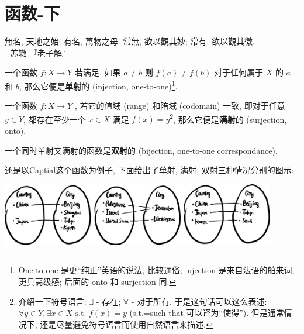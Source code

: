 \section{函数-下}\label{004}

\begin{flushright}{\kaishu 無名, 天地之始; 有名, 萬物之母. 常無, 欲以觀其妙; 常有, 欲以觀其徼. \\- 苏辙 『老子解』}\end{flushright}

\begin{tcolorbox}[size=fbox, breakable, enhanced jigsaw, title={单射, 满射, 双射 (injection, surjection,
bijection)}]

一个函数 $f:X\rightarrow Y$ 若满足, 如果 $a\neq b$ 则
$f(a)\neq f(b)$ 对于任何属于 $X$ 的 $a$ 和 $b$,
那么它便是\textbf{单射}的 (injection, one-to-one)\footnote{One-to-one
  是更``纯正''英语的说法, 比较通俗, injection 是来自法语的舶来词,
  更具高级感; 后面的 onto 和 surjection 同.}.

一个函数 $f:X\rightarrow Y$ , 若它的值域 (range) 和陪域 (codomain)
一致, 即对于任意 $y\in Y$, 都存在至少一个 $x\in X$ 满足
$f(x)=y$\footnote{介绍一下符号语言: $\exists$ - 存在; $\forall$ -
  对于所有. 于是这句话可以这么表述:
  $\forall y\in Y, \exists x\in X \text{ s.t. } f(x)=y$ (s.t.=such that
  可以译为``使得''). 但是通常情况下,
  还是尽量避免符号语言而使用自然语言来描述.}, 那么它便是\textbf{满射}的
(surjection, onto).

一个同时单射又满射的函数是\textbf{双射}的 (bijection, one-to-one
correspondance).

还是以Captial这个函数为例子, 下面给出了单射, 满射,
双射三种情况分别的图示:

\begin{tcolorbox}[size=fbox, breakable, enhanced jigsaw]
\includegraphics[width=0.9\textwidth]{img/image-20230302091706069.png}

\end{tcolorbox}

\end{tcolorbox}

